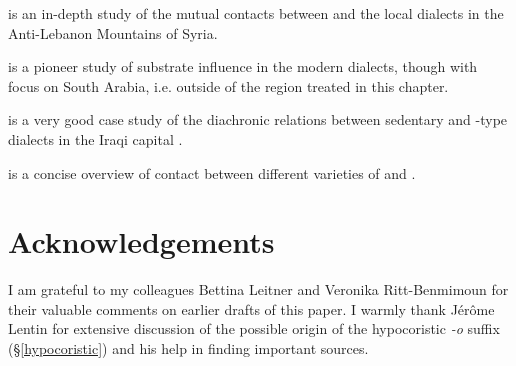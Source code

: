 \documentclass[output=paper]{langsci/langscibook}
\begin{document}
\begin{furtherreading}
\item[\citet{ArnoldBehnstedt1993}] is an in-depth study of the mutual contacts between  and the local  dialects in the Anti-Lebanon Mountains of Syria.
\item[\citet{Diem1979}] is a pioneer study of {substrate} influence in the modern  dialects, though with focus on South Arabia, i.e. outside of the region treated in this chapter.
\item[\citet{Palva2009}] is a very good case study of the diachronic relations between sedentary and -type dialects in the Iraqi capital .
\item[\citet{Weninger2011Aramaic}] is a concise overview of contact between different varieties of  and .
\end{furtherreading}

\section*{Acknowledgements}
I am grateful to my colleagues Bettina Leitner and Veronika Ritt-Benmimoun for their valuable comments on earlier drafts of this paper. I warmly thank Jérôme Lentin for extensive discussion of the possible origin of the hypocoristic \textit{-o} suffix (§\ref{hypocoristic}) and his help in finding important sources.
\end{document}
